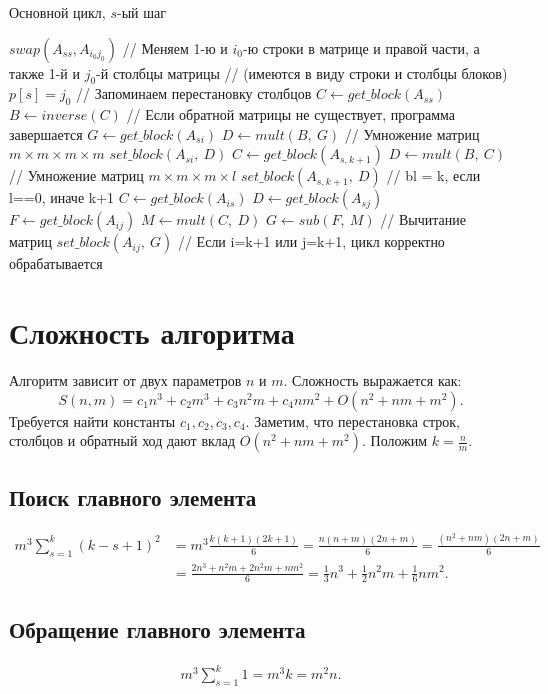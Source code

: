\documentclass[a4paper,12pt]{article}
\begin{document}
\begin{algorithm}
\caption{Основной цикл, $s$-ый шаг}
\begin{algorithmic}[1]
\State $swap(A_{ss},A_{i_0j_0})$
\State // Меняем 1-ю и $i_0$-ю строки в матрице и правой части, а также 1-й и $j_0$-й столбцы матрицы 
\State // (имеются в виду строки и столбцы блоков)
\State $p[s] = j_0$ // Запоминаем перестановку столбцов
\State $C \gets get\_block(A_{ss})$
\State $B \gets inverse(C)$
\State // Если обратной матрицы не существует, программа завершается
    \State $G \gets get\_block(A_{si})$
    \State $D \gets mult(B,\ G)$ // Умножение матриц $m\times m \times m\times m$
    \State $set\_block(A_{si},\ D)$
\EndFor
\State $ C \gets get\_block(A_{s,k+1})$
\State $D \gets mult(B,\ C)$ // Умножение матриц $m\times m \times m\times l$
\State $ set\_block(A_{s,k+1},\ D)$
\State // bl = k, если l==0, иначе k+1
    \State $C \gets get\_block(A_{is})$
        \State $ D \gets get\_block(A_{sj})$
        \State $F \gets get\_block(A_{ij})$
        \State $M \gets mult(C,\ D)$
        \State $G \gets sub(F,\ M)$ // Вычитание матриц
        \State $set\_block(A_{ij},\ G)$
    \EndFor
\EndFor
\State // Если i=k+1 или j=k+1, цикл корректно обрабатывается
\end{algorithmic}
\end{algorithm}

\newpage
\section{Сложность алгоритма}
Алгоритм зависит от двух параметров $n$ и $m$. Сложность выражается как:
$$
S(n,m) = c_1n^3+c_2m^3+c_3n^2m+c_4nm^2+O(n^2+nm+m^2).
$$
Требуется найти константы $c_1,c_2,c_3,c_4$. Заметим, что перестановка строк, столбцов и обратный ход дают вклад $O(n^2+nm+m^2)$. Положим $k = \frac{n}{m}$.

\subsection{Поиск главного элемента}
\begin{align*}
m^3\sum_{s=1}^{k}{(k-s+1)^2} &= m^3\frac{k(k+1)(2k+1)}{6} = \frac{n(n+m)(2n+m)}{6} = \frac{(n^2+nm)(2n+m)}{6} \\
&= \frac{2n^3+n^2m+2n^2m+nm^2}{6} = \frac{1}{3}n^3+\frac{1}{2}n^2m+\frac{1}{6}nm^2.
\end{align*}

\subsection{Обращение главного элемента}
\begin{align*}
m^3\sum_{s=1}^{k}{1} = m^3k = m^2n.
\end{align*}
\end{document}
